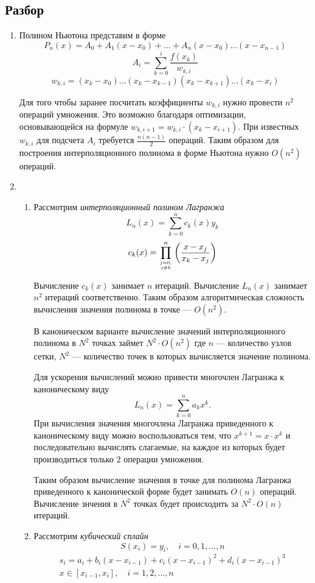 \documentclass[12pt]{article}
\begin{document}
	\subsection{Разбор}
	\begin{enumerate}
		\item Полином Ньютона представим в форме 
		$$ P_n(x) = A_0 + A_1(x-x_0) + ...+ A_n(x - x_0)...(x - x_{n-1}) $$
		$$  A_i = \sum_{k=0}^i\frac{f(x_k)}{w_{k,i}} $$
		$$  w_{k,i} = (x_k - x_0)...(x_k - x_{k-1})(x_k - x_{k+1})...(x_k - x_i) $$
		
		Для того чтобы заранее посчитать коэффициенты $w_{k,i}$ нужно провести $n^2$ операций умножения. 
		Это возможно благодаря оптимизации, основывающейся на формуле $w_{k,i+1} = w_{k,i} \cdot (x_k - x_{i+1})$.
		При известных $w_{k,i}$ для подсчета $A_i$ требуется $\frac{n(n - 1)}{2}$ операций.
		Таким образом для построения интерполяционного полинома в форме Ньютона нужно $O(n^2)$ операций.
		
		\item 
		\begin{enumerate}
		\item Рассмотрим \textit{интерполяционный полином Лагранжа}
		$$ L_{n}(x)=\sum_{k=0}^{n} c_{k}(x) y_{k} $$ 
		$$ c_{k}(x)=\prod_{j=0, \atop j \neq k}^{n}\left(\frac{x-x_{j}}{x_{k}-x_{j}}\right) $$
		
		Вычисление $c_k(x)$ занимает $n$ итераций. Вычисление $L_n(x)$ занимает $n^2$ итераций соответственно. Таким образом алгоритмическая сложность вычисления значения полинома в точке --- $O(n^2)$.
		
		В каноническом варианте вычисление значений интерполяционного полинома в $N^2$ точках займет $N^2 \cdot O(n^2)$ где $n$ --- количество узлов сетки, $N^2$ --- количество точек в которых вычисляется значение полинома.
		
		Для ускорения вычислений можно привести многочлен Лагранжа к каноническому виду $$L_n(x) = \sum_{k = 0}^{n} a_k x^k. $$		
		При вычисления значения многочлена Лагранжа приведенного к каноническому виду можно воспользоваться тем, что $x^{k + 1} = x \cdot x^{k}$
		и последовательно вычислять слагаемые, на каждое из которых будет производиться только $2$ операции умножения.
		
		Таким образом вычисление значения в точке для полинома Лагранжа приведенного к канонической форме будет занимать $O(n)$ операций. 
		Вычисление знчения в $N^2$ точках будет происходить за $N^2 \cdot O(n)$ итераций.
		\item Рассмотрим \textit{кубический сплайн}
		$$ S\left(x_{i}\right)=y_{i}, \quad i=0,1, \ldots, n $$
		$$ \begin{array}{c}
		s_{i}=a_{i}+b_{i}\left(x-x_{i-1}\right)+c_{i}\left(x-x_{i-1}\right)^{2}+d_{i}\left(x-x_{i-1}\right)^{3} \\
		x \in\left[x_{i-1}, x_{i}\right], \quad i=1,2, \ldots, n
		\end{array} $$ 
		

\end{enumerate}
\end{enumerate}
\end{document}
